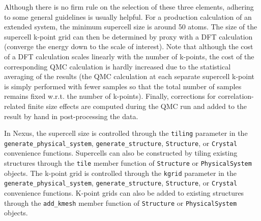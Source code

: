 \documentclass[oneside,11pt]{memoir}
\numberwithin{equation}{section}
\begin{document}
Although there is no firm rule on the selection of these three elements, 
adhering to some general guidelines is usually helpful.  For a production 
calculation of an extended system, the minimum supercell size is around 50 
atoms.  The size of the supercell k-point grid can then be determined by 
proxy with a DFT calculation (converge the energy down to the scale of 
interest).  Note that although the cost of a DFT calculation scales linearly 
with the number of k-points, the cost of the corresponding QMC calculation 
is hardly increased due to the statistical averaging of the results 
(the QMC calculation at each separate supercell k-point is simply performed 
with fewer samples so that the total number of samples remains fixed w.r.t. 
the number of k-points).  Finally, corrections for correlation-related 
finite size effects are computed during the QMC run and added to the result 
by hand in post-processing the data.

In Nexus, the supercell size is controlled through the 
\texttt{tiling} parameter in the \texttt{generate\_physical\_system}, 
\texttt{generate\_structure}, \texttt{Structure}, or \texttt{Crystal} 
convenience functions.  Supercells can also be constructed by tiling existing 
structures through the \texttt{tile} member function of \texttt{Structure} or 
\texttt{PhysicalSystem} objects.  The k-point grid is controlled through the 
\texttt{kgrid} parameter in the 
\texttt{generate\_physical\_system}, 
\texttt{generate\_structure}, \texttt{Structure}, or \texttt{Crystal} 
convenience functions.  K-point grids can also be added to existing structures 
through the \texttt{add\_kmesh} member function of \texttt{Structure} or 
\texttt{PhysicalSystem} objects.
\end{document}
